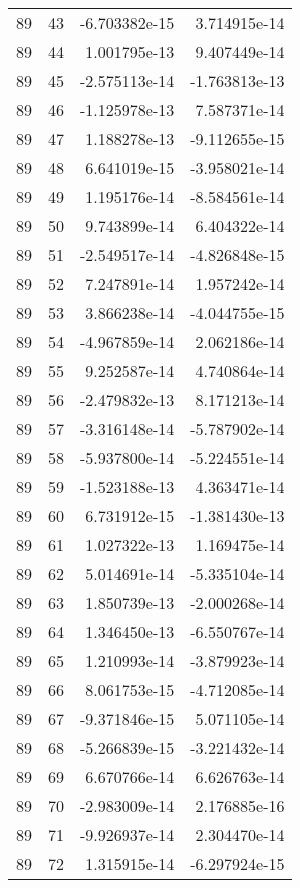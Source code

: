 \begin{tabular}{rrrr}
  89 &   43 & -6.703382e-15 &  3.714915e-14 \\
  89 &   44 &  1.001795e-13 &  9.407449e-14 \\
  89 &   45 & -2.575113e-14 & -1.763813e-13 \\
  89 &   46 & -1.125978e-13 &  7.587371e-14 \\
  89 &   47 &  1.188278e-13 & -9.112655e-15 \\
  89 &   48 &  6.641019e-15 & -3.958021e-14 \\
  89 &   49 &  1.195176e-14 & -8.584561e-14 \\
  89 &   50 &  9.743899e-14 &  6.404322e-14 \\
  89 &   51 & -2.549517e-14 & -4.826848e-15 \\
  89 &   52 &  7.247891e-14 &  1.957242e-14 \\
  89 &   53 &  3.866238e-14 & -4.044755e-15 \\
  89 &   54 & -4.967859e-14 &  2.062186e-14 \\
  89 &   55 &  9.252587e-14 &  4.740864e-14 \\
  89 &   56 & -2.479832e-13 &  8.171213e-14 \\
  89 &   57 & -3.316148e-14 & -5.787902e-14 \\
  89 &   58 & -5.937800e-14 & -5.224551e-14 \\
  89 &   59 & -1.523188e-13 &  4.363471e-14 \\
  89 &   60 &  6.731912e-15 & -1.381430e-13 \\
  89 &   61 &  1.027322e-13 &  1.169475e-14 \\
  89 &   62 &  5.014691e-14 & -5.335104e-14 \\
  89 &   63 &  1.850739e-13 & -2.000268e-14 \\
  89 &   64 &  1.346450e-13 & -6.550767e-14 \\
  89 &   65 &  1.210993e-14 & -3.879923e-14 \\
  89 &   66 &  8.061753e-15 & -4.712085e-14 \\
  89 &   67 & -9.371846e-15 &  5.071105e-14 \\
  89 &   68 & -5.266839e-15 & -3.221432e-14 \\
  89 &   69 &  6.670766e-14 &  6.626763e-14 \\
  89 &   70 & -2.983009e-14 &  2.176885e-16 \\
  89 &   71 & -9.926937e-14 &  2.304470e-14 \\
  89 &   72 &  1.315915e-14 & -6.297924e-15 \\

\end{tabular}
